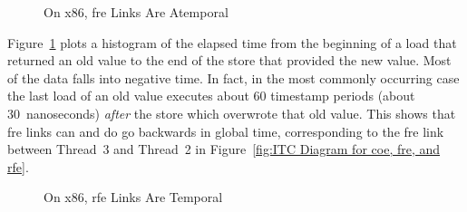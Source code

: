 \documentclass[10]{article}
\begin{document}
\begin{figure}[tb]
\begin{center}
\caption{On x86, fre Links Are Atemporal}
\label{fig:On x86, fre Links Are Atemporal}
\end{center}
\end{figure}

Figure~\ref{fig:On x86, fre Links Are Atemporal}
plots a histogram of the elapsed time from the beginning of a load that
returned an old value to the end of the store that provided the new value.
Most of the data falls into negative time.
In fact, in the most commonly occurring case the last load of an old value
executes about 60 timestamp periods (about 30~nanoseconds) \emph{after}
the store which overwrote that old value.
This shows that fre links can and do go backwards in global time,
corresponding to the fre link between Thread~3 and Thread~2 in
Figure~\ref{fig:ITC Diagram for coe, fre, and rfe}.

\begin{figure}[tb]
\begin{center}
\caption{On x86, rfe Links Are Temporal}
\label{fig:On x86, rfe Links Are Temporal}
\end{center}
\end{figure}
\end{document}
